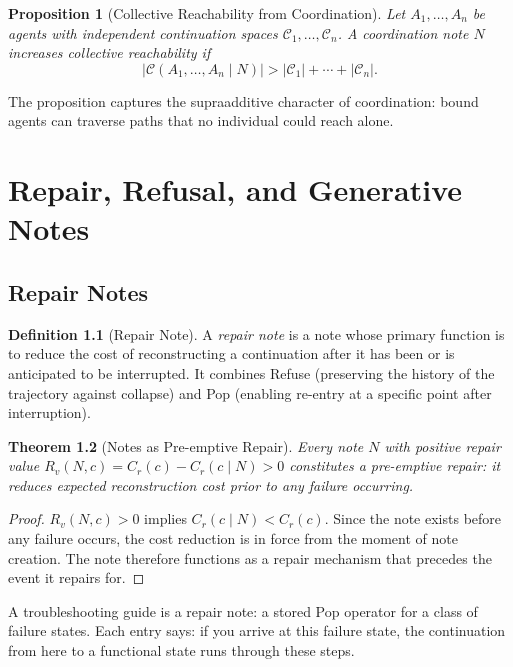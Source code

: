 \documentclass[12pt, a4paper, openany]{book}
\theoremstyle{plain}
\newtheorem{theorem}{Theorem}[chapter]
\newtheorem{proposition}[theorem]{Proposition}
\theoremstyle{definition}
\newtheorem{definition}[theorem]{Definition}
\theoremstyle{remark}
\newcommand{\calC}{\mathcal{C}}
\begin{document}
\begin{proposition}[Collective Reachability from Coordination]
Let $A_1, \ldots, A_n$ be agents with independent continuation spaces
$\calC_1, \ldots, \calC_n$. A coordination note $N$ increases collective
reachability if
\[
|\calC(A_1, \ldots, A_n \mid N)| > |\calC_1| + \cdots + |\calC_n|.
\]
\end{proposition}

The proposition captures the supraadditive character of coordination: bound agents
can traverse paths that no individual could reach alone.

\chapter{Repair, Refusal, and Generative Notes}

\section{Repair Notes}

\begin{definition}[Repair Note]
A \emph{repair note} is a note whose primary function is to reduce the cost of
reconstructing a continuation after it has been or is anticipated to be
interrupted. It combines Refuse (preserving the history of the trajectory against
collapse) and Pop (enabling re-entry at a specific point after interruption).
\end{definition}

\begin{theorem}[Notes as Pre-emptive Repair]
Every note $N$ with positive repair value $R_v(N, c) = C_r(c) - C_r(c \mid N) > 0$
constitutes a pre-emptive repair: it reduces expected reconstruction cost prior
to any failure occurring.
\end{theorem}

\begin{proof}
$R_v(N, c) > 0$ implies $C_r(c \mid N) < C_r(c)$. Since the note exists before
any failure occurs, the cost reduction is in force from the moment of note
creation. The note therefore functions as a repair mechanism that precedes the
event it repairs for.
\end{proof}

A troubleshooting guide is a repair note: a stored Pop operator for a class of
failure states. Each entry says: if you arrive at this failure state, the
continuation from here to a functional state runs through these steps.
\end{document}
